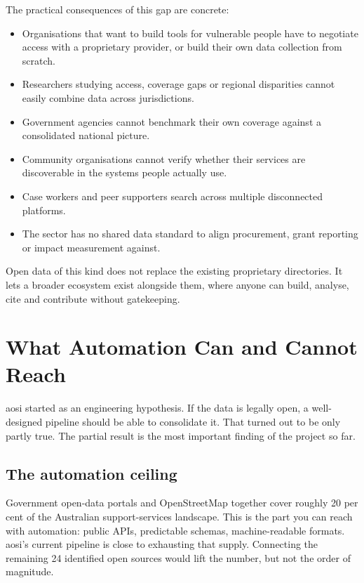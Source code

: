 \documentclass[11pt,a4paper]{article}
\begin{document}
The practical consequences of this gap are concrete:

\begin{itemize}[nosep]
    \item Organisations that want to build tools for vulnerable people have to negotiate access with a proprietary provider, or build their own data collection from scratch.
    \item Researchers studying access, coverage gaps or regional disparities cannot easily combine data across jurisdictions.
    \item Government agencies cannot benchmark their own coverage against a consolidated national picture.
    \item Community organisations cannot verify whether their services are discoverable in the systems people actually use.
    \item Case workers and peer supporters search across multiple disconnected platforms.
    \item The sector has no shared data standard to align procurement, grant reporting or impact measurement against.
\end{itemize}

Open data of this kind does not replace the existing proprietary directories. It lets a broader ecosystem exist alongside them, where anyone can build, analyse, cite and contribute without gatekeeping.


\section{What Automation Can and Cannot Reach}

aosi started as an engineering hypothesis. If the data is legally open, a well-designed pipeline should be able to consolidate it. That turned out to be only partly true. The partial result is the most important finding of the project so far.

\subsection{The automation ceiling}

Government open-data portals and OpenStreetMap together cover roughly 20 per cent of the Australian support-services landscape. This is the part you can reach with automation: public APIs, predictable schemas, machine-readable formats. aosi's current pipeline is close to exhausting that supply. Connecting the remaining 24 identified open sources would lift the number, but not the order of magnitude.
\end{document}
